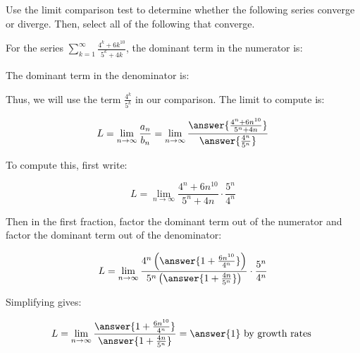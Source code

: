 \documentclass{ximera}
\author{Jim Talamo}
\begin{document}
\begin{exercise}

Use the limit comparison test to determine whether the following series converge or diverge.  Then, select all of the following that converge.

\begin{selectAll}
\end{selectAll}

\begin{hint}

\begin{question}
For the series $\sum_{k=1}^{\infty} \frac{4^k+6k^{10}}{5^k+4k}$, the dominant term in the numerator is:

\begin{multipleChoice}
\end{multipleChoice}

The dominant term in the denominator is:

\begin{multipleChoice}
\end{multipleChoice}

Thus, we will use the term $\frac{4^k}{5^k}$ in our comparison.  The limit to compute is:

\[
L = \lim_{n \to \infty} \frac{a_n}{b_n} = \lim_{n \to \infty} \frac{\answer{\frac{4^n+6n^{10}}{5^n+4n} }}{\answer{\frac{4^n}{5^n}}}
\]
\begin{question}
To compute this, first write:

\[
L =  \lim_{n \to \infty} \frac{4^n+6n^{10}}{5^n+4n} \cdot \frac{5^n}{4^n}
\]

Then in the first fraction, factor the dominant term out of the numerator and factor the dominant term out of the denominator:

\[
L =  \lim_{n \to \infty}  \frac{4^n \left(\answer{1+\frac{6n^{10}}{4^n}}\right)}{5^n\left(\answer{1+\frac{4n}{5^n}}\right)} \cdot \frac{5^n}{4^n}
\]

Simplifying gives:

\[
L =  \lim_{n \to \infty}  \frac{\answer{1+\frac{6n^{10}}{4^n}}}{\answer{1+\frac{4n}{5^n}}} =\answer{1} \textrm{ by growth rates }
\]


\end{question}
\end{question}
\end{hint}
\end{exercise}
\end{document}
